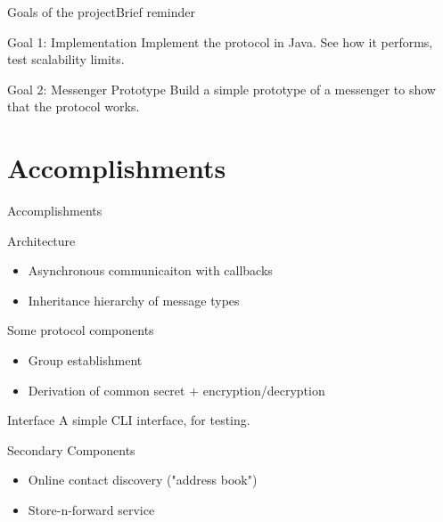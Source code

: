 \documentclass{beamer}
\begin{document}
\begin{frame}{Goals of the project}{Brief reminder}
    \begin{block}{Goal 1: Implementation}
        Implement the protocol in Java. See how it performs, test scalability limits.
    \end{block}
    \begin{block}{Goal 2: Messenger Prototype}
        Build a simple prototype of a messenger to show that the protocol works.
    \end{block}
\end{frame}

\section{Accomplishments}
\begin{frame}{Accomplishments}
    \begin{block}{Architecture}
            \begin{itemize}
                \item Asynchronous communicaiton with callbacks
                \item Inheritance hierarchy of message types
            \end{itemize}
    \end{block}
    \begin{block}{Some protocol components}
        \begin{itemize}
            \item Group establishment
            \item Derivation of common secret + encryption/decryption
        \end{itemize}
    \end{block}
    \begin{block}{Interface}
        A simple CLI interface, for testing.
    \end{block}
    \begin{block}{Secondary Components}
        \begin{itemize}
            \item Online contact discovery ("address book")
            \item Store-n-forward service
        \end{itemize}
    \end{block}
\end{frame}
\end{document}
